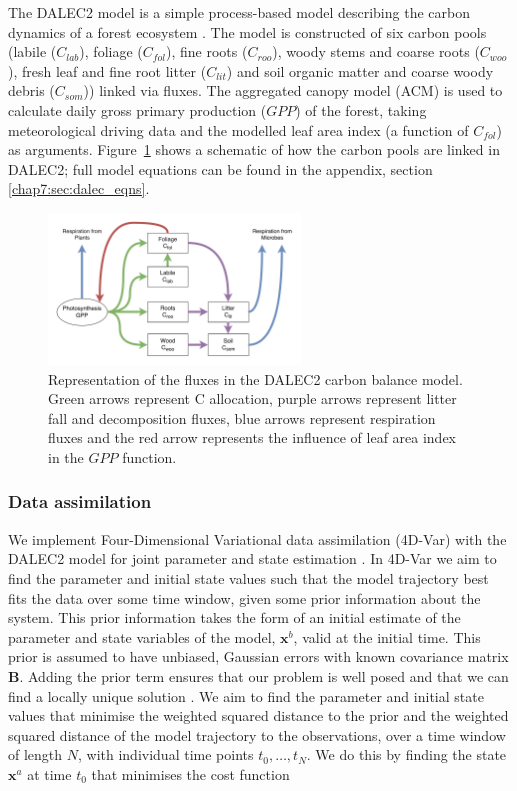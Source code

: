 The DALEC2 model is a simple process-based model describing the carbon dynamics of a forest ecosystem \citep{Bloom2015}. The model is constructed of six carbon pools (labile ($C_{lab}$), foliage ($C_{fol}$), fine roots ($C_{roo}$), woody stems and coarse roots ($C_{woo}$), fresh leaf and fine root litter ($C_{lit}$) and soil organic matter and coarse woody debris ($C_{som}$)) linked via fluxes. The aggregated canopy model (ACM) \citep{williams1997predicting} is used to calculate daily gross primary production ($GPP$) of the forest, taking meteorological driving data and the modelled leaf area index (a function of $C_{fol}$) as arguments. Figure~\ref{chap7:fig:DALEC_mod} shows a schematic of how the carbon pools are linked in DALEC2; full model equations can be found in the appendix, section \ref{chap7:sec:dalec_eqns}.   

\begin{figure}[ht]
    \centering
    \includegraphics[width=0.6\textwidth]{chapter/chapter7/dalec2diag.pdf}
    \caption{Representation of the fluxes in the DALEC2 carbon balance model. Green arrows represent C allocation, purple arrows represent litter fall and decomposition fluxes, blue arrows represent respiration fluxes and the red arrow represents the influence of leaf area index in the $GPP$ function.} \label{chap7:fig:DALEC_mod}
\end{figure}

\subsubsection{Data assimilation} \label{chap7:sec:da}

We implement Four-Dimensional Variational data assimilation (4D-Var) with the DALEC2 model for joint parameter and state estimation \citep{navon1998practical}. In 4D-Var we aim to find the parameter and initial state values such that the model trajectory best fits the data over some time window, given some prior information about the system. This prior information takes the form of an initial estimate of the parameter and state variables of the model, $\textbf{x}^{b}$, valid at the initial time. This prior is assumed to have unbiased, Gaussian errors with known covariance matrix $\textbf{B}$. Adding the prior term ensures that our problem is well posed and that we can find a locally unique solution \citep{Tremolet2006}. We aim to find the parameter and initial state values that minimise the weighted squared distance to the prior and the weighted squared distance of the model trajectory to the observations, over a time window of length \(N\), with individual time points $t_{0}, \dots, t_{N}$. We do this by finding the state $\textbf{x}^{a}$ at time $t_{0}$ that minimises the cost function

